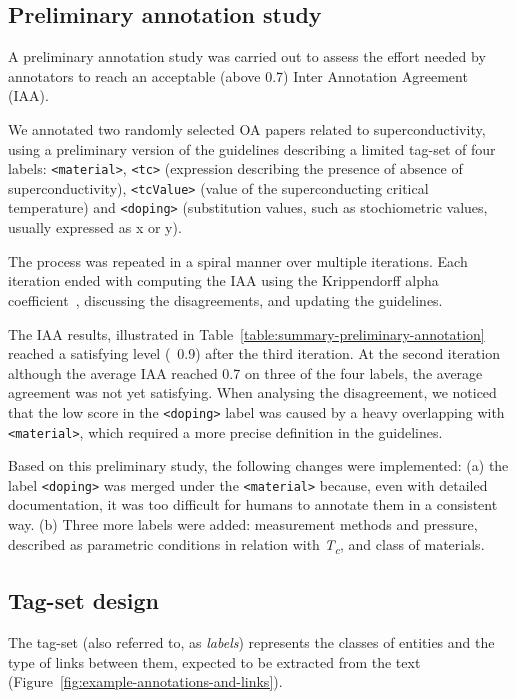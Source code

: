 \documentclass[fleqn,10pt]{wlscirep}
\begin{document}
\subsection*{Preliminary annotation study}
\label{subsec:preliminary-annotation-study}
A preliminary annotation study was carried out to assess the effort needed by annotators to reach an acceptable (above 0.7) Inter Annotation Agreement (IAA).

We annotated two randomly selected OA papers related to superconductivity, using a preliminary version of the guidelines describing a limited tag-set of four labels: \texttt{<material>}, \texttt{<tc>} (expression describing the presence of absence of superconductivity), \texttt{<tcValue>} (value of the superconducting critical temperature) and \texttt{<doping>} (substitution values, such as stochiometric values, usually expressed as x or y).

The process was repeated in a spiral manner over multiple iterations. 
Each iteration ended with computing the IAA using the Krippendorff alpha coefficient~\cite{Krippendorff2004ReliabilityIC,Zapf2016MeasuringIR}, discussing the disagreements, and updating the guidelines.

The IAA results, illustrated in Table~\ref{table:summary-preliminary-annotation} reached a satisfying level (~0.9) after the third iteration. 
At the second iteration although the average IAA reached 0.7 on three of the four labels, the average agreement was not yet satisfying. 
When analysing the disagreement, we noticed that the low score in the \texttt{<doping>} label was caused by a heavy overlapping with \texttt{<material>}, which  required a more precise definition in the guidelines. 

Based on this preliminary study, the following changes were implemented: (a) the label \texttt{<doping>} was merged under the \texttt{<material>} because, even with detailed documentation, it was too difficult for humans to annotate them in a consistent way.
(b) Three more labels were added: measurement methods and pressure, described as parametric conditions in relation with \textit{T\textsubscript{c}}, and class of materials. 

\subsection*{Tag-set design}
The tag-set (also referred to, as \textit{labels}) represents the classes of entities and the type of links between them, expected to be extracted from the text (Figure~\ref{fig:example-annotations-and-links}).
\end{document}
